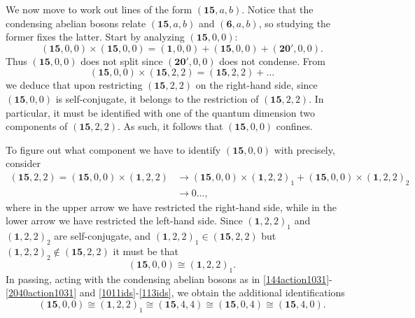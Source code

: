 \documentclass[11pt]{article}
\numberwithin{equation}{section}
\begin{document}
We now move to work out lines of the form $(\mathbf{15},a,b)$. Notice that the condensing abelian bosons relate $(\mathbf{15},a,b)$ and $(\mathbf{6},a,b)$, so studying the former fixes the latter. Start by analyzing $(\mathbf{15},0,0)$:
\begin{equation}
    (\mathbf{15},0,0) \times (\mathbf{15},0,0) = (\mathbf{1},0,0) + (\mathbf{15},0,0) + (\mathbf{20}',0,0).
\end{equation}
Thus $(\mathbf{15},0,0)$ does not split since $(\mathbf{20}',0,0)$ does not condense. From
\begin{equation}
    (\mathbf{15},0,0) \times (\mathbf{15},2,2) = (\mathbf{15},2,2) + \ldots
\end{equation}
we deduce that upon restricting $(\mathbf{15},2,2)$ on the right-hand side, since $(\mathbf{15},0,0)$ is self-conjugate, it belongs to the restriction of $(\mathbf{15},2,2)$. In particular, it must be identified with one of the quantum dimension two components of $(\mathbf{15},2,2)$. As such, it follows that $(\mathbf{15},0,0)$ confines.

To figure out what component we have to identify $(\mathbf{15},0,0)$ with precisely, consider
\begin{align}
    (\mathbf{15},2,2) = (\mathbf{15},0,0) \times (\mathbf{1},2,2) &\longrightarrow (\mathbf{15},0,0) \times (\mathbf{1},2,2)_{1} +  (\mathbf{15},0,0) \times (\mathbf{1},2,2)_{2} \nonumber \\[0.3cm] &\longrightarrow 0 \ldots,
\end{align}
where in the upper arrow we have restricted the right-hand side, while in the lower arrow we have restricted the left-hand side. Since $(\mathbf{1},2,2)_{1}$ and $(\mathbf{1},2,2)_{2}$ are self-conjugate, and $(\mathbf{1},2,2)_{1} \in (\mathbf{15},2,2)$ but $(\mathbf{1},2,2)_{2} \notin (\mathbf{15},2,2)$ it must be that
\begin{equation} \label{1500identification}
    (\mathbf{15},0,0) \cong (\mathbf{1},2,2)_{1}.
\end{equation}
In passing, acting with the condensing abelian bosons as in \eqref{144action1031}-\eqref{2040action1031} and \eqref{1011ids}-\eqref{113ids}, we obtain the additional identifications
\begin{equation} \label{idsof1500}
    (\mathbf{15},0,0) \cong (\mathbf{1},2,2)_{1} \cong (\mathbf{15},4,4) \cong (\mathbf{15},0,4) \cong (\mathbf{15},4,0).
\end{equation}
\end{document}
